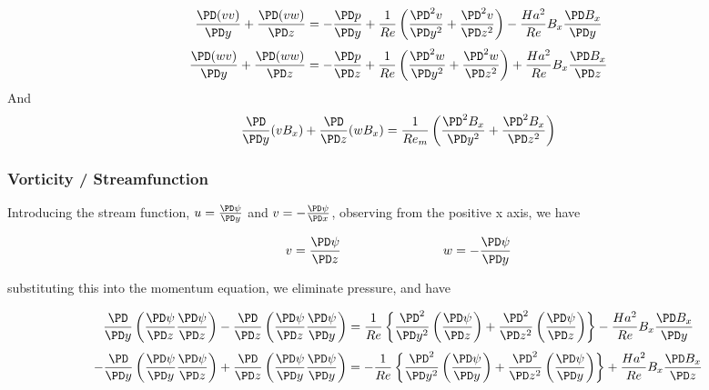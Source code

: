 \documentclass[11pt]{article}
\begin{document}
\begin{equation}
	\frac{\PD (v v)}{\PD y}
	+ \frac{\PD (v w)}{\PD z}
	=
	- \frac{\PD p}{\PD y}
	+ \frac{1}{Re}
	\left(
	\frac{\PD^2 v}{\PD y^2}
	+\frac{\PD^2 v}{\PD z^2}
	\right)
	-
	\frac{Ha^2}{Re}
	B_x
	\frac{\PD B_x}{\PD y}
\end{equation}
\begin{equation}
	\frac{\PD (w v)}{\PD y}
	+ \frac{\PD (w w)}{\PD z}
	=
	- \frac{\PD p}{\PD z}
	+ \frac{1}{Re}
	\left(
	\frac{\PD^2 w}{\PD y^2}
	+\frac{\PD^2 w}{\PD z^2}
	\right)
	+ \frac{Ha^2}{Re}
	B_x
	\frac{\PD B_x}{\PD z}
\end{equation}
And
\begin{equation}
	\frac{\PD}{\PD y} (v B_x)
	+ \frac{\PD}{\PD z} (w B_x)
	=
	\frac{1}{Re_m}
	\left(
	\frac{\PD^2 B_x}{\PD y^2}
	+
	\frac{\PD^2 B_x}{\PD z^2}
	\right)
\end{equation}

\subsubsection{Vorticity / Streamfunction}

Introducing the stream function, $u = \frac{\PD \psi}{\PD y}$ and $v = - \frac{\PD \psi}{\PD x}$, observing from the positive x axis, we have

\begin{equation}
	v = \frac{\PD \psi}{\PD z}
	\qquad \qquad \qquad \qquad
	w = - \frac{\PD \psi}{\PD y}
\end{equation}

substituting this into the momentum equation, we eliminate pressure, and have

\begin{equation}
	\frac{\PD}{\PD y}
	\left(
	\frac{\PD \psi}{\PD z}
	\frac{\PD \psi}{\PD z}
	\right)
	-
	\frac{\PD}{\PD z}
	\left(
	\frac{\PD \psi}{\PD z}
	\frac{\PD \psi}{\PD y}
	\right)
	=
	\frac{1}{Re}
	\left\{
	\frac{\PD^2}{\PD y^2}
	\left(
	\frac{\PD \psi}{\PD z}
	\right)
	+
	\frac{\PD^2}{\PD z^2}
	\left(
	\frac{\PD \psi}{\PD z}
	\right)
	\right\}
	-
	\frac{Ha^2}{Re}
	B_x
	\frac{\PD B_x}{\PD y}
\end{equation}
\begin{equation}
	-\frac{\PD}{\PD y}
	\left(
	\frac{\PD \psi}{\PD y}
	\frac{\PD \psi}{\PD z}
	\right)
	+ \frac{\PD}{\PD z}
	\left(
	\frac{\PD \psi}{\PD y}
	\frac{\PD \psi}{\PD y}
	\right)
	=
	- \frac{1}{Re}
	\left\{
	\frac{\PD^2}{\PD y^2}
	\left(
	\frac{\PD \psi}{\PD y}
	\right)
	+\frac{\PD^2}{\PD z^2}
	\left(
	\frac{\PD \psi}{\PD y}
	\right)
	\right\}
	+ \frac{Ha^2}{Re}
	B_x
	\frac{\PD B_x}{\PD z}
\end{equation}
\end{document}
